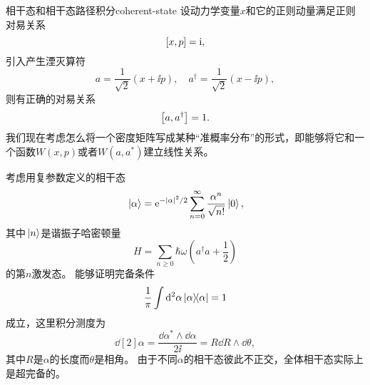 \begin{back}{相干态和相干态路径积分}{coherent-state}
    设动力学变量$x$和它的正则动量满足正则对易关系
    \begin{equation}
        \comm{x}{p} = \ii,
    \end{equation}
    引入产生湮灭算符
    \begin{equation}
        a = \frac{1}{\sqrt{2}} (x + \ii p), \quad a^\dagger = \frac{1}{\sqrt{2}} (x - \ii p),
    \end{equation}
    则有正确的对易关系
    \begin{equation}
        \comm{a}{a^\dagger} = 1.
    \end{equation}
    我们现在考虑怎么将一个密度矩阵写成某种“准概率分布”的形式，即能够将它和一个函数$W(x, p)$或者$W(a, a^*)$建立线性关系。

    考虑用复参数定义的相干态
    \begin{equation}
        \ket*{\alpha} = \mathrm{e}^{- \abs*{\alpha}^2 / 2} \sum_{n = 0}^\infty \frac{\alpha^n}{\sqrt{n!}} \ket*{0},
    \end{equation}
    其中$\ket*{n}$是谐振子哈密顿量
    \begin{equation}
        H = \sum_{n \geq 0} \hbar \omega \left( a^\dagger a + \frac{1}{2} \right) 
    \end{equation}
    的第$n$激发态。
    能够证明完备条件
    \begin{equation}
        \frac{1}{\pi} \int \dd[2]{\alpha} \dyad{\alpha} = 1
    \end{equation}
    成立，这里积分测度为
    \begin{equation}
        \dd[2]{\alpha} = \frac{\dd{\alpha^*} \wedge \dd{\alpha}}{2 \ii} = R \dd{R} \wedge \dd{\theta},
    \end{equation}
    其中$R$是$\alpha$的长度而$\theta$是相角。
    由于不同$\alpha$的相干态彼此不正交，全体相干态实际上是超完备的。

\end{back}